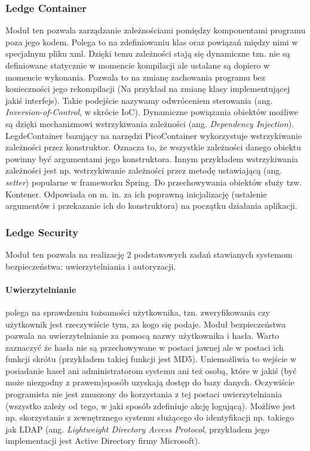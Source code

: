 \subsubsection{Ledge Container}
Moduł ten pozwala zarządzanie zależnościami pomiędzy komponentami programu poza jego kodem. Polega to na zdefiniowaniu klas oraz powiązań między nimi w specjalnym pliku xml. Dzięki temu zależności stają się dynamiczne tzn. nie są definiowane statycznie w momencie kompilacji ale ustalane są dopiero w momencie wykonania. Pozwala to na zmianę zachowania programu bez konieczności jego rekompilacji (Na przykład na zmianę klasy implementującej jakiś interfejs). Takie podejście nazywamy odwróceniem sterowania (ang. \textit{Inversion-of-Control}, w skrócie IoC). Dynamiczne powiązania obiektów możliwe są dzięki mechanizmowi wstrzykiwania zależności (ang. \textit{Dependency Injection}). LegdeContainer bazujący na narzędzi PicoContainer wykorzystuje wstrzykiwanie zależności przez konstruktor. Oznacza to, że wszystkie zależności danego obiektu powinny być argumentami jego konstruktora. Innym przykładem wstrzykiwania zależności jest np. wstrzykiwanie zależności przez metodę ustawiającą (ang. \textit{setter}) popularne w frameworku Spring. Do przechowywania obiektów służy tzw. Kontener. Odpowiada on m. in. za ich poprawną inicjalizację (ustalenie argumentów i przekazanie ich do konstruktora) na początku działania aplikacji.

\subsubsection{Ledge Security}
\label{security}
Moduł ten pozwala na realizację 2 podstawowych zadań stawianych systemom bezpieczeństwa: uwierzytelniania i autoryzacji.

\paragraph{Uwierzytelnianie} polega na sprawdzeniu tożsamości użytkownika, tzn. zweryfikowania czy użytkownik jest rzeczywiście tym, za kogo się podaje. Moduł bezpieczeństwa pozwala na uwierzytelnianie za pomocą nazwy użytkownika i hasła. Warto zaznaczyć że hasła nie są przechowywane w postaci jawnej ale w postaci ich funkcji skrótu (przykładem takiej funkcji jest MD5). Uniemożliwia to wejście w posiadanie haseł ani administratorom systemu ani też osobą, które w jakiś (być może niezgodny z prawem)sposób uzyskają dostęp do bazy danych. Oczywiście programista nie jest zmuszony do korzystania z tej postaci uwierzytelniania (wszystko zależy od tego, w jaki sposób zdefiniuje akcję logującą). Możliwe jest np. skorzystanie z zewnętrznego systemu służącego do identyfikacji np. takiego jak LDAP (ang. \textit{Lightweight Directory Access Protocol}, przykładem jego implementacji jest Active Directory firmy Microsoft).

